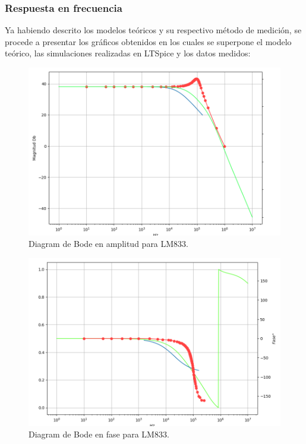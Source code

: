 \subsubsection{Respuesta en frecuencia}

Ya habiendo descrito los modelos teóricos y su respectivo método de medición, se procede a presentar los gráficos obtenidos en los cuales se superpone el modelo teórico, las simulaciones realizadas en LTSpice y los datos medidos:

\begin{figure}[H]	
	\centering
	\includegraphics[width=\textwidth]{Ejercicio2/Imagenes/Bode_Amp_LM833.png}
	\caption{Diagram de Bode en amplitud para LM833.}
	\label{fig:bode_amp_LM833.}
\end{figure}

\begin{figure}[H]	
	\centering
	\includegraphics[width=\textwidth]{Ejercicio2/Imagenes/Bode_Fase_LM833.png}
	\caption{Diagram de Bode en fase para LM833.}
	\label{fig:bode_fase_LM833.}
\end{figure}

